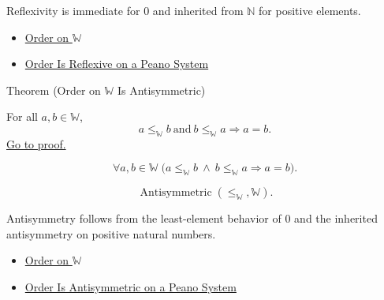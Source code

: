 \begin{remark*}[Interpretation]
Reflexivity is immediate for $0$ and inherited from $\mathbb{N}$ for positive
elements.
\end{remark*}

\begin{dependencies}
\begin{itemize}
  \item \hyperref[def:order-on-w]{Order on $\mathbb{W}$}
  \item \hyperref[thm:order-reflexive-on-peano-system]{Order Is Reflexive on a Peano System}
\end{itemize}
\end{dependencies}

\begin{theorembox}{Theorem (Order on \texorpdfstring{$\mathbb{W}$}{W} Is Antisymmetric)}
\begin{theorem}
\label{thm:order-on-w-antisymmetric}
For all $a,b\in\mathbb{W}$,
\[
a\leq_{\mathbb{W}}b\ \text{and}\ b\leq_{\mathbb{W}}a
\Longrightarrow a=b.
\]
\hyperref[prf:order-on-w-antisymmetric]{Go to proof.}
\end{theorem}
\end{theorembox}

\begin{remark*}
\[
\forall a,b\in\mathbb{W}\;
\bigl(a\leq_{\mathbb{W}}b\ \wedge\ b\leq_{\mathbb{W}}a
\Longrightarrow a=b\bigr).
\]
\end{remark*}

\begin{remark*}
\[
\operatorname{Antisymmetric}(\leq_{\mathbb{W}},\mathbb{W}).
\]
\end{remark*}

\begin{remark*}[Interpretation]
Antisymmetry follows from the least-element behavior of $0$ and the inherited
antisymmetry on positive natural numbers.
\end{remark*}

\begin{dependencies}
\begin{itemize}
  \item \hyperref[def:order-on-w]{Order on $\mathbb{W}$}
  \item \hyperref[thm:order-antisymmetric-on-peano-system]{Order Is Antisymmetric on a Peano System}
\end{itemize}
\end{dependencies}

